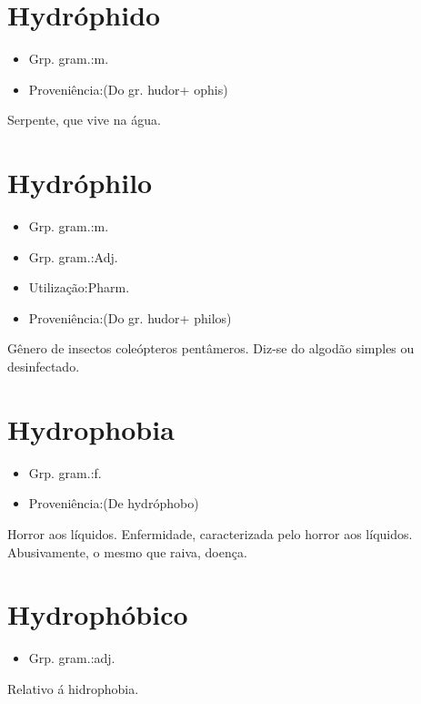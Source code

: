 \documentclass{article}
\begin{document}
\section{Hydróphido}
\begin{itemize}
\item {Grp. gram.:m.}
\end{itemize}
\begin{itemize}
\item {Proveniência:(Do gr. \textunderscore hudor\textunderscore  + \textunderscore ophis\textunderscore )}
\end{itemize}
Serpente, que vive na água.
\section{Hydróphilo}
\begin{itemize}
\item {Grp. gram.:m.}
\end{itemize}
\begin{itemize}
\item {Grp. gram.:Adj.}
\end{itemize}
\begin{itemize}
\item {Utilização:Pharm.}
\end{itemize}
\begin{itemize}
\item {Proveniência:(Do gr. \textunderscore hudor\textunderscore  + \textunderscore philos\textunderscore )}
\end{itemize}
Gênero de insectos coleópteros pentâmeros.
Diz-se do algodão simples ou desinfectado.
\section{Hydrophobia}
\begin{itemize}
\item {Grp. gram.:f.}
\end{itemize}
\begin{itemize}
\item {Proveniência:(De \textunderscore hydróphobo\textunderscore )}
\end{itemize}
Horror aos líquidos.
Enfermidade, caracterizada pelo horror aos líquidos.
Abusivamente, o mesmo que \textunderscore raiva\textunderscore , doença.
\section{Hydrophóbico}
\begin{itemize}
\item {Grp. gram.:adj.}
\end{itemize}
Relativo á hidrophobia.
\end{document}
